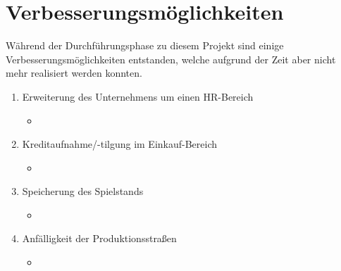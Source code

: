 \clearpage
\chapter{Verbesserungsmöglichkeiten}
Während der Durchführungsphase zu diesem Projekt sind einige Verbesserungsmöglichkeiten entstanden, welche aufgrund der Zeit aber nicht mehr realisiert werden konnten.
\begin{enumerate}
	\item Erweiterung des Unternehmens um einen HR-Bereich
\begin{itemize}
	\item
\end{itemize} 
	\item Kreditaufnahme/-tilgung im Einkauf-Bereich
\begin{itemize}
	\item
\end{itemize} 
	\item Speicherung des Spielstands
\begin{itemize}
	\item
\end{itemize} 
	\item Anfälligkeit der Produktionsstraßen
\begin{itemize}
	\item
\end{itemize} 	
\end{enumerate}




